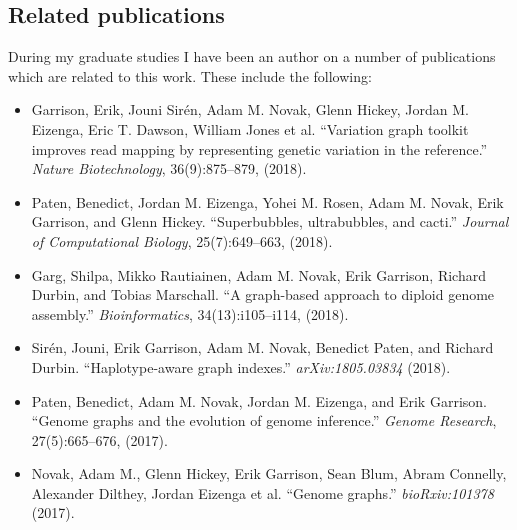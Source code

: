 \documentclass[a4paper,12pt,numbered,oneside]{Classes/PhDThesisPSnPDF}
\begin{document}

\begin{appendices} %

\chapter{Related publications}

During my graduate studies I have been an author on a number of publications which are related to this work.
These include the following:

\begin{itemize}[noitemsep]

\item Garrison, Erik, Jouni Sirén, Adam M. Novak, Glenn Hickey, Jordan M. Eizenga, Eric T. Dawson, William Jones et al. ``Variation graph toolkit improves read mapping by representing genetic variation in the reference.'' \emph{Nature Biotechnology}, 36(9):875--879, (2018).

\item Paten, Benedict, Jordan M. Eizenga, Yohei M. Rosen, Adam M. Novak, Erik Garrison, and Glenn Hickey. ``Superbubbles, ultrabubbles, and cacti.'' \emph{Journal of Computational Biology}, 25(7):649--663, (2018).

\item Garg, Shilpa, Mikko Rautiainen, Adam M. Novak, Erik Garrison, Richard Durbin, and Tobias Marschall. ``A graph-based approach to diploid genome assembly.'' \emph{Bioinformatics}, 34(13):i105--i114, (2018).

\item Sirén, Jouni, Erik Garrison, Adam M. Novak, Benedict Paten, and Richard Durbin. ``Haplotype-aware graph indexes.'' \emph{arXiv:1805.03834} (2018).

\item Paten, Benedict, Adam M. Novak, Jordan M. Eizenga, and Erik Garrison. ``Genome graphs and the evolution of genome inference.'' \emph{Genome Research}, 27(5):665--676, (2017).

\item Novak, Adam M., Glenn Hickey, Erik Garrison, Sean Blum, Abram Connelly, Alexander Dilthey, Jordan Eizenga et al. ``Genome graphs.'' \emph{bioRxiv:101378} (2017).


\end{itemize}
\end{appendices}
\end{document}
